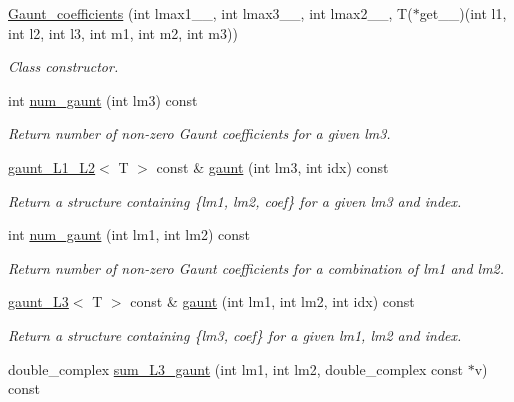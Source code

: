 \begin{DoxyCompactItemize}
\item 
\hyperlink{classsirius_1_1_gaunt__coefficients_ae2eee44a241029be94264e9c8b537fd4}{Gaunt\+\_\+coefficients} (int lmax1\+\_\+\+\_\+, int lmax3\+\_\+\+\_\+, int lmax2\+\_\+\+\_\+, T($\ast$get\+\_\+\+\_\+)(int l1, int l2, int l3, int m1, int m2, int m3))
\begin{DoxyCompactList}\small\item\em Class constructor. \end{DoxyCompactList}\item 
int \hyperlink{classsirius_1_1_gaunt__coefficients_ad978bc0626ea40e495eaac37b6002b3c}{num\+\_\+gaunt} (int lm3) const 
\begin{DoxyCompactList}\small\item\em Return number of non-\/zero Gaunt coefficients for a given lm3. \end{DoxyCompactList}\item 
\hyperlink{structsirius_1_1gaunt___l1___l2}{gaunt\+\_\+\+L1\+\_\+\+L2}$<$ T $>$ const \& \hyperlink{classsirius_1_1_gaunt__coefficients_ae439613a736064aa2672d2faa82f2d7b}{gaunt} (int lm3, int idx) const 
\begin{DoxyCompactList}\small\item\em Return a structure containing \{lm1, lm2, coef\} for a given lm3 and index. \end{DoxyCompactList}\item 
int \hyperlink{classsirius_1_1_gaunt__coefficients_a3ac5ba2112609de47e76d41c21dabdaa}{num\+\_\+gaunt} (int lm1, int lm2) const 
\begin{DoxyCompactList}\small\item\em Return number of non-\/zero Gaunt coefficients for a combination of lm1 and lm2. \end{DoxyCompactList}\item 
\hyperlink{structsirius_1_1gaunt___l3}{gaunt\+\_\+\+L3}$<$ T $>$ const \& \hyperlink{classsirius_1_1_gaunt__coefficients_a45c06c07129ceb19405311abd1b38f87}{gaunt} (int lm1, int lm2, int idx) const 
\begin{DoxyCompactList}\small\item\em Return a structure containing \{lm3, coef\} for a given lm1, lm2 and index. \end{DoxyCompactList}\item 
double\+\_\+complex \hyperlink{classsirius_1_1_gaunt__coefficients_a610a3dfa10d5649151b3b84b44545d03}{sum\+\_\+\+L3\+\_\+gaunt} (int lm1, int lm2, double\+\_\+complex const $\ast$v) const 

\end{DoxyCompactItemize}
